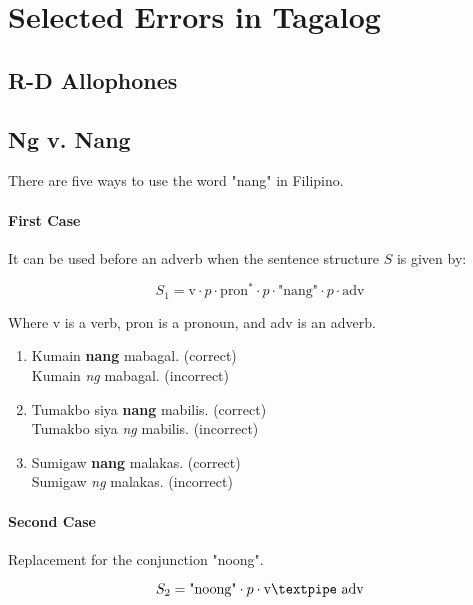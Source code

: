 \section{Selected Errors in Tagalog}
\subsection{R-D Allophones}
\subsection{Ng v. Nang}

There are five ways to use the word "nang" in Filipino.

\paragraph{First Case} It can be used before an adverb when the sentence structure $S$ is given by:

\[
      S_1 = \text{v} \cdot p \cdot \text{pron}^* \cdot p \cdot \text{"nang"} \cdot p \cdot \text{adv}
\]

Where v is a verb, pron is a pronoun, and adv is an adverb.

\begin{example}

\end{example}

\begin{enumerate}
      \item Kumain \textbf{nang} mabagal. (correct)
            \\ Kumain \textit{ng} mabagal. (incorrect)
      \item Tumakbo siya \textbf{nang} mabilis. (correct)
            \\ Tumakbo siya \textit{ng} mabilis. (incorrect)
      \item Sumigaw \textbf{nang} malakas. (correct)
            \\ Sumigaw \textit{ng} malakas. (incorrect)
\end{enumerate}

\paragraph{Second Case} Replacement for the conjunction "noong".

\[
      S_2 = \text{"noong"} \cdot p \cdot \text{v\textpipe adv}
\]

\begin{example}

\end{example}

